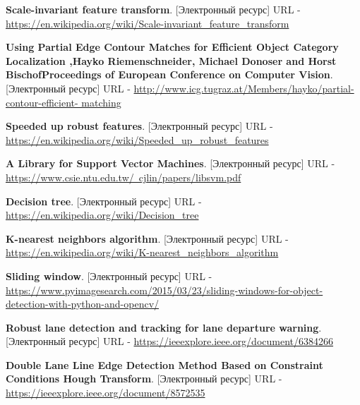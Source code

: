 \begin{thebibliography}{2}
	\textbf{Scale-invariant feature transform}. [Электронный ресурс] URL - 
	\href{https://en.wikipedia.org/wiki/Scale-invariant_feature_transform}{https://en.wikipedia.org/wiki/Scale-invariant\_feature\_transform}
	
	\textbf{Using Partial Edge Contour Matches for Efficient Object Category
		Localization ,Hayko Riemenschneider, Michael Donoser and Horst
		BischofProceedings of European Conference on Computer Vision}. [Электронный ресурс] URL - 
	\href{http://www.icg.tugraz.at/Members/hayko/partial-contour-efficient-
		matching}{http://www.icg.tugraz.at/Members/hayko/partial-contour-efficient-
		matching}
	
	\textbf{Speeded up robust features}. [Электронный ресурс] URL - 
	\href{https://en.wikipedia.org/wiki/Speeded\_up_robust\_features}{https://en.wikipedia.org/wiki/Speeded\_up\_robust\_features}
	
	\textbf{A Library for Support Vector Machines}. [Электронный ресурс] URL - 
	\href{https://www.csie.ntu.edu.tw/~cjlin/papers/libsvm.pdf}{https://www.csie.ntu.edu.tw/~cjlin/papers/libsvm.pdf}
	
	\textbf{Decision tree}. [Электронный ресурс] URL - 
	\href{https://en.wikipedia.org/wiki/Decision\_tree}{https://en.wikipedia.org/wiki/Decision\_tree}
	
	\textbf{K-nearest neighbors algorithm}. [Электронный ресурс] URL - 
	\href{https://en.wikipedia.org/wiki/K-nearest\_neighbors\_algorithm}{https://en.wikipedia.org/wiki/K-nearest\_neighbors\_algorithm}
	
	\textbf{Sliding window}. [Электронный ресурс] URL - 
	\href{https://www.pyimagesearch.com/2015/03/23/sliding-windows-for-object-detection-with-python-and-opencv/}{https://www.pyimagesearch.com/2015/03/23/sliding-windows-for-object-detection-with-python-and-opencv/}
	
	\textbf{Robust lane detection and tracking for lane departure warning}. [Электронный ресурс] URL - 
	\href{https://ieeexplore.ieee.org/document/6384266}{https://ieeexplore.ieee.org/document/6384266}
	
	\textbf{Double Lane Line Edge Detection Method Based on
		Constraint Conditions Hough Transform}. [Электронный ресурс] URL - 
	\href{https://ieeexplore.ieee.org/document/8572535}{https://ieeexplore.ieee.org/document/8572535}
	

\end{thebibliography}
